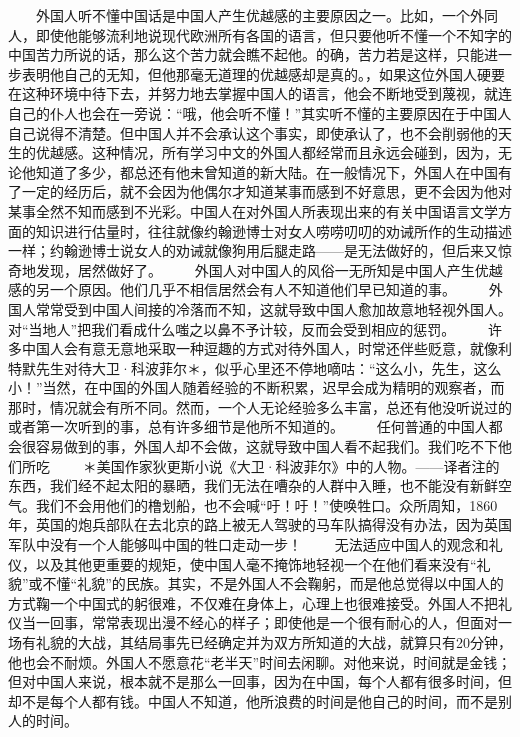 \documentclass[12pt,oneside]{book}
\begin{document}
\begin{common-format}
　　外国人听不懂中国话是中国人产生优越感的主要原因之一。比如，一个外同人，即使他能够流利地说现代欧洲所有各国的语言，但只要他听不懂一个不知字的中国苦力所说的话，那么这个苦力就会瞧不起他。的确，苦力若是这样，只能进一步表明他自己的无知，但他那毫无道理的优越感却是真的。，如果这位外国人硬要在这种环境中待下去，并努力地去掌握中国人的语言，他会不断地受到蔑视，就连自己的仆人也会在一旁说：“哦，他会听不懂！”其实听不懂的主要原因在于中国人自己说得不清楚。但中国人并不会承认这个事实，即使承认了，也不会削弱他的天生的优越感。这种情况，所有学习中文的外国人都经常而且永远会碰到，因为，无论他知道了多少，都总还有他未曾知道的新大陆。在一般情况下，外国人在中国有了一定的经历后，就不会因为他偶尔才知道某事而感到不好意思，更不会因为他对某事全然不知而感到不光彩。中国人在对外国人所表现出来的有关中国语言文学方面的知识进行估量时，往往就像约翰逊博士对女人唠唠叨叨的劝诫所作的生动描述一样；约翰逊博士说女人的劝诫就像狗用后腿走路——是无法做好的，但后来又惊奇地发现，居然做好了。 
　　外国人对中国人的风俗一无所知是中国人产生优越感的另一个原因。他们几乎不相信居然会有人不知道他们早已知道的事。 
　　外国人常常受到中国人间接的冷落而不知，这就导致中国人愈加故意地轻视外国人。对“当地人”把我们看成什么嗤之以鼻不予计较，反而会受到相应的惩罚。 
　　许多中国人会有意无意地采取一种逗趣的方式对待外国人，时常还伴些贬意，就像利特默先生对待大卫·科波菲尔＊，似乎心里还不停地嘀咕：“这么小，先生，这么小！”当然，在中国的外国人随着经验的不断积累，迟早会成为精明的观察者，而那时，情况就会有所不同。然而，一个人无论经验多么丰富，总还有他没听说过的或者第一次听到的事，总有许多细节是他所不知道的。 
　　任何普通的中国人都会很容易做到的事，外国人却不会做，这就导致中国人看不起我们。我们吃不下他们所吃 
　　＊美国作家狄更斯小说《大卫·科波菲尔》中的人物。——译者注的东西，我们经不起太阳的暴晒，我们无法在嘈杂的人群中入睡，也不能没有新鲜空气。我们不会用他们的橹划船，也不会喊“吁！吁！”使唤牲口。众所周知，1860年，英国的炮兵部队在去北京的路上被无人驾驶的马车队搞得没有办法，因为英国军队中没有一个人能够叫中国的牲口走动一步！ 
　　无法适应中国人的观念和礼仪，以及其他更重要的规矩，使中国人毫不掩饰地轻视一个在他们看来没有“礼貌”或不懂“礼貌”的民族。其实，不是外国人不会鞠躬，而是他总觉得以中国人的方式鞠一个中国式的躬很难，不仅难在身体上，心理上也很难接受。外国人不把礼仪当一回事，常常表现出漫不经心的样子；即使他是一个很有耐心的人，但面对一场有礼貌的大战，其结局事先已经确定并为双方所知道的大战，就算只有20分钟，他也会不耐烦。外国人不愿意花“老半天”时间去闲聊。对他来说，时间就是金钱；但对中国人来说，根本就不是那么一回事，因为在中国，每个人都有很多时间，但却不是每个人都有钱。中国人不知道，他所浪费的时间是他自己的时间，而不是别人的时间。 

\end{common-format}
\end{document}
